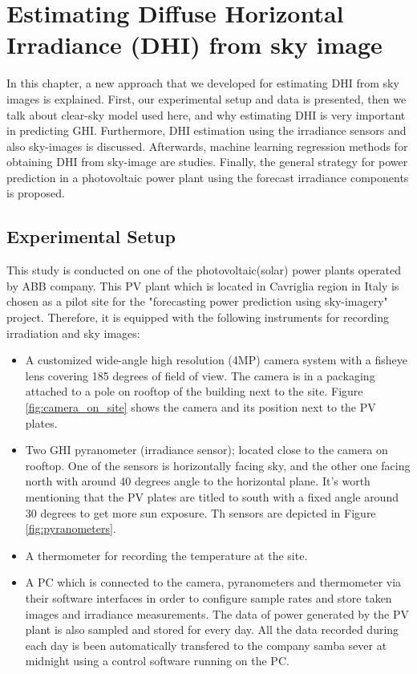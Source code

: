 \chapter{Estimating Diffuse Horizontal Irradiance (DHI) from sky image}
In this chapter, a new approach that we developed for estimating DHI from sky images is explained. First, our experimental setup and data is presented, then we talk about clear-sky model used here, and why estimating DHI is very important in predicting GHI. Furthermore, DHI estimation using the irradiance sensors and also sky-images is discussed. Afterwards, machine learning regression methods for obtaining DHI from sky-image are studies. Finally, the general strategy for power prediction in a photovoltaic power plant using the forecast irradiance components is proposed.

\section{Experimental Setup}
This study is conducted on one of the photovoltaic(solar) power plants operated by ABB company. This PV plant which is located in Cavriglia region in Italy is chosen as a pilot site for the "forecasting power prediction using sky-imagery" project. Therefore, it is equipped with the following instruments for recording irradiation and sky images:
\begin{itemize}
\item A customized wide-angle high resolution (4MP) camera system with a fisheye lens covering 185 degrees of field of view. The camera is in a packaging attached to a pole on rooftop of the building next to the site. Figure \ref{fig:camera_on_site} shows the camera and its position next to the PV plates.
\item Two GHI pyranometer (irradiance sensor); located close to the camera on rooftop. One of the sensors is horizontally facing sky, and the other one facing north with around 40 degrees angle to the horizontal plane. It's worth mentioning that the PV plates are titled to south with a fixed angle around 30 degrees to get more sun exposure.  Th sensors are depicted in Figure \ref{fig:pyranometers}.
\item A thermometer for recording the temperature at the site.
\item A PC which is connected to the camera, pyranometers and thermometer via their software interfaces in order to configure sample rates and store taken images and irradiance measurements. The data of power generated by the PV plant is also sampled and stored for every day. All the data recorded during each day is been automatically transfered to the company samba sever at midnight using a control software running on the PC.
\end{itemize}


